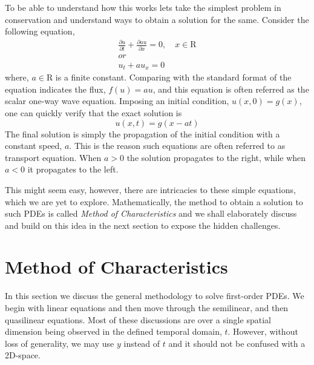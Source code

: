 \documentclass[11pt, a4paper]{report}
\begin{document}
To be able to understand how this works lets take the simplest problem in conservation and understand ways to obtain
a solution for the same. Consider the following equation,
\begin{equation} \label{firstexample}
    \begin{gathered} %
        \frac{\partial u}{\partial t} + \frac{\partial au}{\partial x} = 0, \quad x\in\mathrm{R}\\
        or\\
        u_t + a{u_x} = 0
    \end{gathered}
\end{equation}
where, $a\in\mathrm{R}$ is a finite constant. Comparing with the standard format of the equation indicates the flux, 
$f(u) = au$, and this equation is often referred as the scalar one-way wave equation. Imposing an initial condition,
$u(x,0) = g(x)$, one can quickly verify that the exact solution is 
\begin{equation*}
    u(x, t) = g(x - at)    
\end{equation*}
The final solution is simply the propagation of the initial condition with a constant speed, $a$. This is the
reason such equations are often referred to as transport equation. When $a>0$ the solution propagates to the right, 
while when $a<0$ it propagates to the left. 

This might seem easy, however, there are intricacies to these simple equations, which we are yet to explore. 
Mathematically, the method to obtain a solution to such PDEs is called {\emph {Method of Characteristics}} and we 
shall elaborately discuss and build on this idea in the next section to expose the hidden challenges.

\section{Method of Characteristics}
In this section we discuss the general methodology to solve first-order PDEs. We begin with linear equations and 
then move through the semilinear, and then quasilinear equations. Most of these discussions are over a single 
spatial dimension being observed in the defined temporal domain, $t$. However, without loss of generality, we may
use $y$ instead of $t$ and it should not be confused with a 2D-space.

\end{document}
